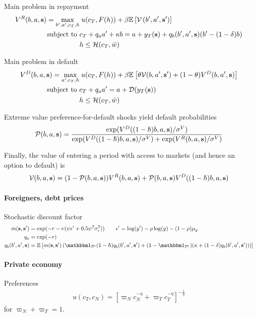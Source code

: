 Main problem in repayment
\begin{align}
	V^R(b,a,\text{\textbf{s}}) = \max_{b',a',c_T, h} &\; u(c_T, F(h)) + \beta \mathbb{E}_{{}}\left[ \mathcal{V}\left(b',a',\text{\textbf{s}}'\right) \right] \\
	\text{subject to }
	& c_T + q_a a' + \kappa b = a + y_T(\text{\textbf{s}}) + q_b(b',a',\text{\textbf{s}}) (b' - (1-\delta) b) \notag\\
	& h \leq \mathcal{H}(c_T, \bar{w}) \notag
\end{align}

Main problem in default
\begin{align}
	V^D(b,a,\text{\textbf{s}}) = \max_{a',c_T, h} &\; u(c_T, F(h)) + \beta \mathbb{E}_{{}}\left[  \theta \mathcal{V}(b,a',\text{\textbf{s}}') + (1-\theta) V^D(b,a',\text{\textbf{s}})  \right] \\
	\text{subject to }
	& c_T + q_a a' = a + \mathcal{D}(y_T(\text{\textbf{s}})) \notag \\
	& h \leq \mathcal{H}(c_T, \bar{w}) \notag
\end{align}

Extreme value preference-for-default shocks yield default probabilities
\begin{align}
	\mathcal{P}(b,a,\text{\textbf{s}}) = \frac{ \exp(V^D((1-\hslash)b,a,\text{\textbf{s}}) / \sigma^V) }{\exp(V^D((1-\hslash)b,a,\text{\textbf{s}}) / \sigma^V) + \exp(V^R(b,a,\text{\textbf{s}}) / \sigma^V)}
\end{align}

Finally, the value of entering a period with access to markets (and hence an option to default) is
\begin{align}
	\mathcal{V}(b,a,\text{\textbf{s}}) = (1-\mathcal{P}(b,a,\text{\textbf{s}})) V^R(b,a,\text{\textbf{s}}) + \mathcal{P}(b,a,\text{\textbf{s}}) V^D((1-\hslash)b,a,\text{\textbf{s}})
\end{align}

\paragraph{Foreigners, debt prices}
Stochastic discount factor
\begin{align}
	m(\state, \state') &= \exp(-r - \nu (\psi \epsilon' + 0.5 \psi^2\sigma_\epsilon^2)) \qquad \epsilon' = \log(y') - \rho\log(y) - (1-\rho)\mu_y\\
	q_a &= \exp(-r) \\
	q_b(b',a',\state) &= \ex{ m(\state,\state') \left(\ind_\mathcal{D'} (1-\hslash) q_b(b',a',\state') + (1-\ind_\mathcal{D'})(\kappa + (1-\delta)q_b(b',a',\state')) \right) }
\end{align}

\paragraph{Private economy}
Preferences
\begin{align}
	u(c_T,c_N) = \left[ \varpi_N c_N^{-\eta} + \varpi_T c_T^{-\eta} \right]^{-\frac{1}{\eta}}
\end{align}
for $\varpi_N + \varpi_T = 1$.

